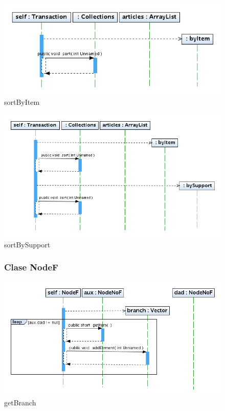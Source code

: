 \begin{figure}
\centering
\includegraphics[width=1\textwidth]{imgsSecuencia/Transaction/sortByItem.png}
\caption{sortByItem}
\end{figure}
\newpage

\begin{figure}
\centering
\includegraphics[width=1\textwidth]{imgsSecuencia/Transaction/sortBySupport.png}
\caption{sortBySupport}
\end{figure}
\newpage


\begin{figure}
\subsubsection{Clase NodeF}
\centering
\includegraphics[width=1\textwidth]{imgsSecuencia/NodeF/getBranch.png}
\caption{getBranch}
\end{figure}
\newpage

